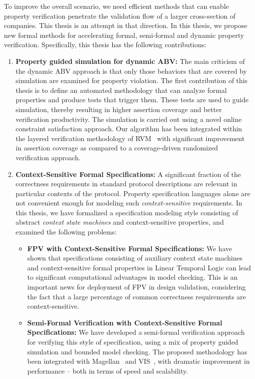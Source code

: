 \documentclass[a4paper, 11pt]{article}
\begin{document}
To improve the overall scenario, we need efficient methods that can 
enable property verification penetrate the validation flow of 
a larger cross-section of companies. This thesis is an attempt in that
direction. In this thesis, we propose new formal methods 
for accelerating formal, semi-formal and dynamic property verification.
Specifically, this thesis has the following contributions:
\begin{enumerate}
\item {\bf Property guided simulation for dynamic ABV:}
	The main criticism of the dynamic ABV approach is that only those 
	behaviors that are covered by simulation are examined for property 
	violation. The first contribution 
	of this thesis is to define an automated methodology that can analyze 
	formal properties and produce tests that trigger them. These tests 
	are used to guide simulation, thereby resulting in higher assertion 
	coverage and better verification productivity. The simulation is 
	carried out using a novel online constraint satisfaction approach. 
	Our algorithm has been 
	integrated within the layered verification methodology of RVM~\cite{rvm} 
	with significant improvement in assertion coverage as compared to 
	a coverage-driven randomized verification approach.

\item {\bf Context-Sensitive Formal Specifications:} A significant fraction 
	of the 
	correctness requirements in standard protocol descriptions are relevant 
	in particular contexts of the protocol. Property specification languages 
	alone are not convenient enough for modeling such {\em context-sensitive} 
	requirements. In this thesis, we have formalized a specification 
	modeling style consisting of abstract {\em context state machines} and 
	context-sensitive properties, and examined the following problems:

\begin{itemize}
\item {\bf FPV with Context-Sensitive Formal Specifications:} We have shown 
	that 
	specifications consisting of auxiliary context state machines and 
	context-sensitive formal properties in Linear Temporal Logic can 
	lead to significant computational advantages in model checking. 
	This is an important news for deployment of FPV in design validation, 
	considering the fact that a large percentage of common correctness 
	requirements are context-sensitive. 

\item {\bf Semi-Formal Verification with Context-Sensitive Formal 
	Specifications:}
	We have developed a semi-formal verification approach for verifying 
	this style of specification, using a mix of property guided simulation 
	and bounded model checking. The proposed methodology has been integrated 
	with Magellan~\cite{magellan} and VIS~\cite{vis}, with dramatic 
	improvement in performance -- both in terms of speed and scalability.


\end{itemize}
\end{enumerate}
\end{document}
